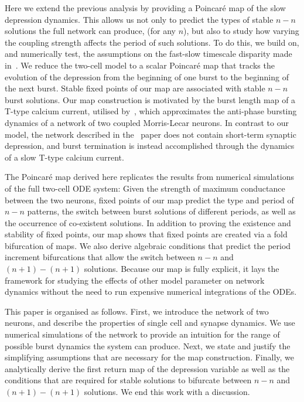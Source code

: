 \documentclass[../manuscript.tex]{subfiles}
\begin{document}
Here we extend the previous analysis by providing a Poincaré map of the slow depression
dynamics.  This allows us not only to predict the types of stable $n-n$ solutions the full
network can produce, (for any $n$), but also to study how varying the coupling strength
affects the period of such solutions.  To do this, we build on, and numerically test, the
assumptions on the fast-slow timescale disparity made in~\cite{bose2011}.  We reduce the
two-cell model to a scalar Poincaré map that tracks the evolution of the depression from
the beginning of one burst to the beginning of the next burst.  Stable fixed points of our
map are associated with stable $n-n$ burst solutions.  Our map construction is motivated
by the burst length map of a T-type calcium current, utilised by~\citet{matveev2007},
which approximates the anti-phase bursting dynamics of a network of two coupled
Morris-Lecar neurons.  In contrast to our model, the network described in
the~\cite{matveev2007} paper does not contain short-term synaptic depression, and burst
termination is instead accomplished through the dynamics of a slow T-type calcium current.

The Poincaré map derived here replicates the results from numerical simulations of the
full two-cell ODE system: Given the strength of maximum conductance between the two
neurons, fixed points of our map predict the type and period of $n-n$ patterns, the switch
between burst solutions of different periods, as well as the occurrence of co-existent
solutions.  In addition to proving the existence and stability of fixed points, our map
shows that fixed points are created via a fold bifurcation of maps.  We also derive
algebraic conditions that predict the period increment bifurcations that allow the switch
between $n-n$ and $(n+1)-(n+1)$ solutions.  Because our map is fully explicit, it lays the
framework for studying the effects of other model parameter on network dynamics without
the need to run expensive numerical integrations of the ODEs.

This paper is organised as follows.  First, we introduce the network of two neurons, and
describe the properties of single cell and synapse dynamics.  We use numerical simulations
of the network to provide an intuition for the range of possible burst dynamics the system
can produce.  Next, we state and justify the simplifying assumptions that are necessary
for the map construction.  Finally, we analytically derive the first return map of the
depression variable as well as the conditions that are required for stable solutions to
bifurcate between $n-n$ and $(n+1)-(n+1)$ solutions.  We end this work with a discussion.
\end{document}
